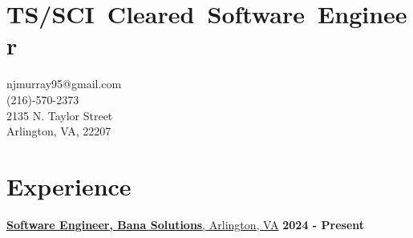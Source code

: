 \documentclass[margin,line]{resume}
\begin{document}
\begin{resume}


    \noindent
    \begin{minipage}[t]{0.7\textwidth}
        \raggedright
        \section{\LARGE \mbox{TS/SCI Cleared Software Engineer}}
    \end{minipage}%
    \hfill
    \begin{minipage}[t]{0.3\textwidth}
        \begin{flushright}
        \small
            \hfill njmurray95@gmail.com \\
            \hfill (216)-570-2373 \\
            \hfill 2135 N. Taylor Street \\
            \hfill Arlington, VA, 22207
        \end{flushright}
    \end{minipage}


    \section{\mysidestyle Experience}
    \hfill

    \underline{\textbf{Software Engineer, Bana Solutions}, Arlington, VA}
    \hfill \textbf{\hfill 2024 - Present} \\


\end{resume}
\end{document}
